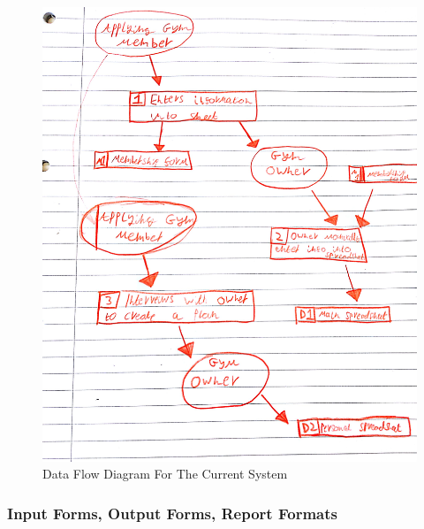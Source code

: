 \begin{figure}[H]
    \includegraphics[width=\textwidth]{DFD-Current.jpg}
    \caption{Data Flow Diagram For The Current System} \label{fig:Data Flow Diagram For The Current System}
\end{figure}


\subsubsection{Input Forms, Output Forms, Report Formats}

